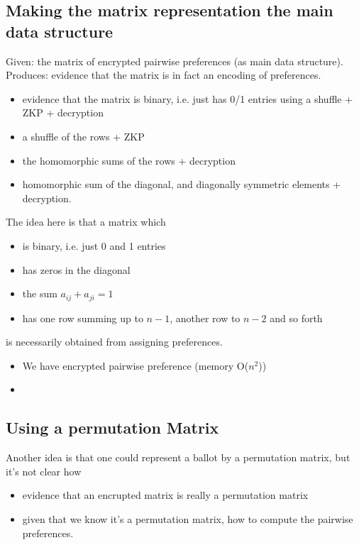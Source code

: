 \documentclass{llncs}
\begin{document}
\subsection{Making the matrix representation the main data
structure}

Given: the matrix of encrypted pairwise preferences (as main data
structure). Produces: evidence that the matrix is in fact an
encoding of preferences.

\begin{itemize}
\item  evidence that the matrix is binary, i.e. just has 0/1 entries
 using a shuffle + ZKP + decryption
\item  a shuffle of the rows + ZKP
\item  the homomorphic sums of the rows + decryption
\item  homomorphic sum of the diagonal, and diagonally symmetric elements
 + decryption.
\end{itemize}

The idea here is that a matrix which 
\begin{itemize}
\item is binary, i.e. just 0 and 1 entries
\item has zeros in the diagonal
\item the sum $a_{ij} + a_{ji} = 1$
\item has one row summing up to $n-1$, another row to $n-2$ and so
forth
\end{itemize}
is necessarily obtained from assigning preferences.

\begin{itemize}
\item We have encrypted pairwise preference (memory O($n^2$))
\item 
\end{itemize}


\subsection{Using a permutation Matrix}

Another idea is that one could represent a ballot by a permutation
matrix, but it's not clear how
\begin{itemize}
\item evidence that an encrupted matrix is really a permutation
matrix
\item given that we know it's a permutation matrix, how to compute
the pairwise preferences.
\end{itemize}
\end{document}
